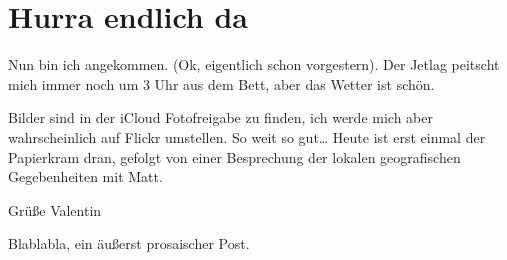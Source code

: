 \chapter{Hurra endlich da}

Nun bin ich angekommen. (Ok, eigentlich schon vorgestern). Der Jetlag
peitscht mich immer noch um 3 Uhr aus dem Bett, aber das Wetter ist
schön.

Bilder sind in der iCloud Fotofreigabe zu finden, ich werde mich aber
wahrscheinlich auf Flickr umstellen. So weit so gut\ldots{} Heute ist
erst einmal der Papierkram dran, gefolgt von einer Besprechung der
lokalen geografischen Gegebenheiten mit Matt.

Grüße Valentin

Blablabla, ein äußerst prosaischer Post.
